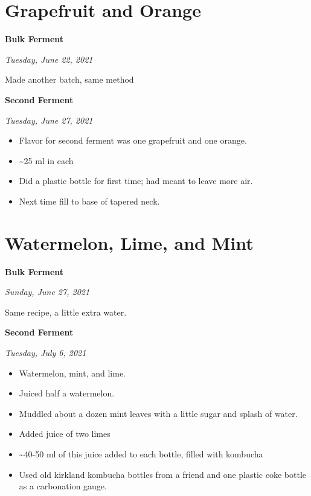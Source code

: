 \documentclass[
]{book}
\providecommand{\tightlist}{%
  \setlength{\itemsep}{0pt}\setlength{\parskip}{0pt}}
\begin{document}
\hypertarget{grapefruit-and-orange}{%
\section{Grapefruit and Orange}\label{grapefruit-and-orange}}

\textbf{Bulk Ferment}

\emph{Tuesday, June 22, 2021}

Made another batch, same method

\textbf{Second Ferment}

\emph{Tuesday, June 27, 2021}

\begin{itemize}
\tightlist
\item
  Flavor for second ferment was one grapefruit and one orange.
\item
  \textasciitilde25 ml in each
\item
  Did a plastic bottle for first time; had meant to leave more air.
\item
  Next time fill to base of tapered neck.
\end{itemize}

\hypertarget{watermelon-lime-and-mint}{%
\section{Watermelon, Lime, and Mint}\label{watermelon-lime-and-mint}}

\textbf{Bulk Ferment}

\emph{Sunday, June 27, 2021}

Same recipe, a little extra water.

\textbf{Second Ferment}

\emph{Tuesday, July 6, 2021}

\begin{itemize}
\tightlist
\item
  Watermelon, mint, and lime.
\item
  Juiced half a watermelon.
\item
  Muddled about a dozen mint leaves with a little sugar and splash of water.
\item
  Added juice of two limes
\item
  \textasciitilde40-50 ml of this juice added to each bottle, filled with kombucha
\item
  Used old kirkland kombucha bottles from a friend and one plastic coke bottle as a carbonation gauge.
\end{itemize}
\end{document}

